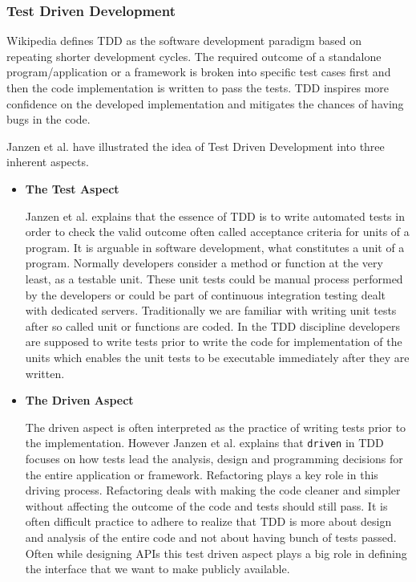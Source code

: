 \subsubsection{Test Driven Development}
Wikipedia \cite{wikitdd} defines TDD as the software development paradigm based on repeating shorter development cycles. The required outcome of a standalone program/application or a framework is broken into specific test cases first and then the code implementation is written to pass the tests. TDD inspires more confidence on the developed implementation and mitigates the chances of having bugs in the code.
\par Janzen et al. \cite{janzen2005test} have illustrated the idea of Test Driven Development into three inherent aspects.
\begin{itemize}
	\item \textbf{The Test Aspect}
	\par Janzen et al. \cite{janzen2005test} explains that the essence of TDD is to write automated tests in order to check the valid outcome often called acceptance criteria for units of a program. It is arguable in software development, what constitutes a unit of a program. Normally developers consider a method or function at the very least, as a testable unit. These unit tests could be manual process performed by the developers or could be part of continuous integration testing dealt with dedicated servers. Traditionally we are familiar with writing unit tests after so called unit or functions are coded. In the TDD discipline developers are supposed to write tests prior to write the code for implementation of the units which enables the unit tests to be executable immediately after they are written.
	\item \textbf{The Driven Aspect}
	\par The driven aspect is often interpreted as the practice of writing tests prior to the implementation. However Janzen et al. \cite{janzen2005test}  explains that \texttt{driven} in TDD focuses on how tests lead the analysis, design and programming decisions for the entire application or framework. Refactoring plays a key role in this driving process. Refactoring deals with making the code cleaner and simpler without affecting the outcome of the code and tests should still pass. It is often difficult practice to adhere to realize that TDD is more about design and analysis of the entire code and not about having bunch of tests passed. Often while designing APIs this test driven aspect plays a big role in defining the interface that we want to make publicly available.

\end{itemize}
